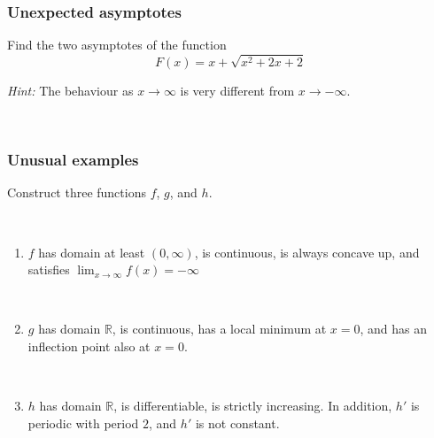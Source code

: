 \documentclass[14pt]{beamer}
\newcommand {\DS} [1] {${\displaystyle #1}$}
\newcommand {\R}{\mathbb{R}}
\begin{document}
\begin{frame}[t]
\frametitle{Unexpected asymptotes}


Find the two asymptotes of the function
	$$
		F(x) = x + \sqrt{x^2+2x+ 2}
	$$

\emph{Hint:} The behaviour as $x \to \infty$ is very different from $x \to - \infty$.


\ \hfill \href{https://www.desmos.com/calculator/kffnbl6pnc}{}

\end{frame}

\begin{frame}[t]
\frametitle{Unusual examples}

Construct three functions $f$, $g$, and $h$.

\
\begin{enumerate}
	\item  $f$ has domain at least $(0,\infty)$, is continuous, is always concave up, and satisfies \DS{\lim_{x \to \infty} f(x) = - \infty}

	\
	\item  $g$ has domain $\R$, is continuous, has a local minimum at $x=0$, and has an inflection point also at $x=0$.
	
	\
	\item  $h$ has domain $\R$, is differentiable, is strictly increasing.  In addition, $h'$ is periodic with period $2$, and $h'$ is not constant.
	
\end{enumerate}


\end{frame}
\end{document}
